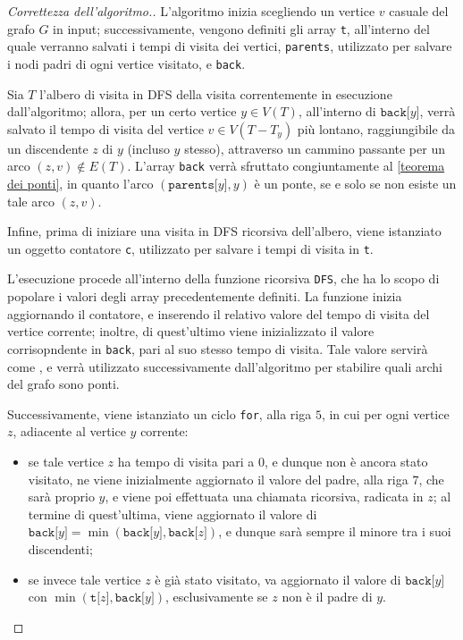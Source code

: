 \documentclass[a4paper, 12pt]{report}
\begin{document}
    \begin{proof}[Correttezza dell'algoritmo.]
        L'algoritmo inizia scegliendo un vertice $v$ casuale del grafo $G$ in input; successivamente, vengono definiti gli array \texttt{t}, all'interno del quale verranno salvati i tempi di visita dei vertici, \texttt{parents}, utilizzato per salvare i nodi padri di ogni vertice visitato, e \texttt{back}.

        Sia $T$ l'albero di visita in DFS della visita correntemente in esecuzione dall'algoritmo; allora, per un certo vertice $y \in V(T)$, all'interno di $\texttt{back[}y\texttt{]}$, verrà salvato il tempo di visita del vertice $v \in V(T - T_y)$ più lontano, raggiungibile da un discendente $z$ di $y$ (incluso $y$ stesso), attraverso un cammino passante per un arco $(z, v) \notin E(T)$. L'array \texttt{back} verrà sfruttato congiuntamente al \cref{teorema dei ponti}, in quanto l'arco $(\texttt{parents[}y\texttt{]}, y)$ è un ponte, se e solo se non esiste un tale arco $(z, v)$.

        Infine, prima di iniziare una visita in DFS ricorsiva dell'albero, viene istanziato un oggetto contatore \texttt{c}, utilizzato per salvare i tempi di visita in \texttt{t}.

        L'esecuzione procede all'interno della funzione ricorsiva \texttt{DFS}, che ha lo scopo di popolare i valori degli array precedentemente definiti. La funzione inizia aggiornando il contatore, e inserendo il relativo valore del tempo di visita del vertice corrente; inoltre, di quest'ultimo viene inizializzato il valore corrisopndente in \texttt{back}, pari al suo stesso tempo di visita. Tale valore servirà come , e verrà utilizzato successivamente dall'algoritmo per stabilire quali archi del grafo sono ponti.

        Successivamente, viene istanziato un ciclo \texttt{for}, alla riga $5$, in cui per ogni vertice $z$, adiacente al vertice $y$ corrente:

        \begin{itemize}
            \item se tale vertice $z$ ha tempo di visita pari a $0$, e dunque non è ancora stato visitato, ne viene inizialmente aggiornato il valore del padre, alla riga $7$, che sarà proprio $y$, e viene poi effettuata una chiamata ricorsiva, radicata in $z$; al termine di quest'ultima, viene aggiornato il valore di $\texttt{back[}y\texttt{]} = \min(\texttt{back[}y\texttt{]}, \texttt{back[}z\texttt{]})$, e dunque sarà sempre il minore tra i suoi discendenti;
            \item se invece tale vertice $z$ è già stato visitato, va aggiornato il valore di $\texttt{back[}y\texttt{]}$ con $\min(\texttt{t[}z\texttt{]}, \texttt{back[}y\texttt{]})$, esclusivamente se $z$ non è il padre di $y$.
        \end{itemize}


\end{proof}
\end{document}
